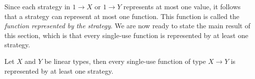 Since each strategy in $1 \to X$ or $1 \to Y$ represents at most one value, it follows that a strategy can represent at most one function. This function is called the \emph{function represented by the strategy}.  We are now ready to state the main result of this section, which is that every single-use function is represented by at least one strategy.
\begin{lemma}\label{lem:all-functions-represented}
    Let $X$ and $Y$ be linear types, then every single-use function of type $X \to Y$ is represented by at least one strategy. 
\end{lemma}
